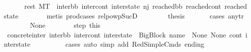 \begin{isabellebody}
\ \ \ \ \ \ rest{\isacharcolon}{\kern0pt}\ {\isachardoublequoteopen}M{\isacharcomma}{\kern0pt}{\isasymLambda}{\isacharcomma}{\kern0pt}{\isasymGamma}{\isacharcomma}{\kern0pt}{\isasymOmega}{\isacharcomma}{\kern0pt}T\ {\isasymturnstile}\ {\isacharparenleft}{\kern0pt}inter{\isacharunderscore}{\kern0pt}bb{\isacharcomma}{\kern0pt}\ inter{\isacharunderscore}{\kern0pt}cont{\isacharcomma}{\kern0pt}\ inter{\isacharunderscore}{\kern0pt}state{\isacharparenright}{\kern0pt}\ {\isacharminus}{\kern0pt}n{\isasymlongrightarrow}{\isacharcircum}{\kern0pt}j{\isacharprime}{\kern0pt}\ {\isacharparenleft}{\kern0pt}reached{\isacharunderscore}{\kern0pt}bb{\isacharcomma}{\kern0pt}\ reached{\isacharunderscore}{\kern0pt}cont{\isacharcomma}{\kern0pt}\ reached{\isacharunderscore}{\kern0pt}state{\isacharparenright}{\kern0pt}{\isachardoublequoteclose}\isanewline
\ \ \ \ \ \ \isamarkupfalse%
\ {\isacharparenleft}{\kern0pt}metis\ prod{\isacharunderscore}{\kern0pt}cases{}\ relpowp{\isacharunderscore}{\kern0pt}Suc{\isacharunderscore}{\kern0pt}D{}{\isacharparenright}{\kern0pt}\ \isanewline
\ \ \ \ \isamarkupfalse%
\ \isamarkupfalse%
\ {\isacharquery}{\kern0pt}thesis\ \isanewline
\ \ \ \ \isamarkupfalse%
\ {\isacharparenleft}{\kern0pt}cases\ any{\isacharunderscore}{\kern0pt}tr{\isacharparenright}{\kern0pt}\isanewline
\ \ \ \ \ \ \isamarkupfalse%
\ None\isanewline
\ \ \ \ \ \ \isamarkupfalse%
\ step\ this\ \isamarkupfalse%
\ concrete{\isacharunderscore}{\kern0pt}inter{\isacharcolon}{\kern0pt}\ {\isachardoublequoteopen}{\isacharparenleft}{\kern0pt}inter{\isacharunderscore}{\kern0pt}bb{\isacharcomma}{\kern0pt}\ inter{\isacharunderscore}{\kern0pt}cont{\isacharcomma}{\kern0pt}\ inter{\isacharunderscore}{\kern0pt}state{\isacharparenright}{\kern0pt}\ {\isacharequal}{\kern0pt}\ {\isacharparenleft}{\kern0pt}BigBlock\ name\ {\isacharbrackleft}{\kern0pt}{\isacharbrackright}{\kern0pt}\ None\ None{\isacharcomma}{\kern0pt}\ cont{}{\isacharcomma}{\kern0pt}\ inter{\isacharunderscore}{\kern0pt}state{\isacharparenright}{\kern0pt}{\isachardoublequoteclose}\isanewline
\ \ \ \ \ \ \ \ \isamarkupfalse%
\ {\isacharparenleft}{\kern0pt}cases{\isacharparenright}{\kern0pt}\ {\isacharparenleft}{\kern0pt}auto\ simp\ add{\isacharcolon}{\kern0pt}\ RedSimpleCmds\ ending{\isacharparenright}{\kern0pt}\isanewline
\isanewline
\ \ \ \ \ \ \isamarkupfalse%

\end{isabellebody}
